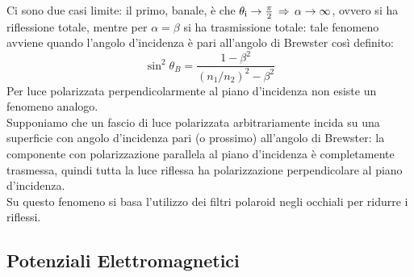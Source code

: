 Ci sono due casi limite: il primo, banale, è che $ \theta_{\text{i}} \rightarrow \frac{\pi}{2} \,\Rightarrow\, \alpha \rightarrow \infty $, ovvero si ha riflessione totale, mentre per $ \alpha = \beta $ si ha trasmissione totale: tale fenomeno avviene quando l'angolo d'incidenza è pari all'angolo di Brewster così definito:
\begin{equation}
	\sin^2 \theta_B = \frac{1 - \beta^2}{(n_1 / n_2)^2 - \beta^2}
	\label{eq:70}
\end{equation}
Per luce polarizzata perpendicolarmente al piano d'incidenza non esiste un fenomeno analogo. \\ 
Supponiamo che un fascio di luce polarizzata arbitrariamente incida su una superficie con angolo d'incidenza pari (o prossimo) all'angolo di Brewster: la componente con polarizzazione parallela al piano d'incidenza è completamente trasmessa, quindi tutta la luce riflessa ha polarizzazione perpendicolare al piano d'incidenza. \\ 
Su questo fenomeno si basa l'utilizzo dei filtri polaroid negli occhiali per ridurre i riflessi.

\subsection{Potenziali Elettromagnetici}

